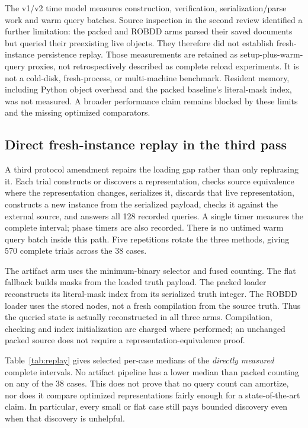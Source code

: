 \documentclass[11pt]{article}
\theoremstyle{definition}\newtheorem{definition}[theorem]{Definition}
\theoremstyle{remark}\newtheorem{remark}[theorem]{Remark}
\begin{document}
The v1/v2 time model measures construction, verification, serialization/parse work and warm query batches. Source inspection in the second review identified a further limitation: the packed and ROBDD arms parsed their saved documents but queried their preexisting live objects. They therefore did not establish fresh-instance persistence replay. Those measurements are retained as setup-plus-warm-query proxies, not retrospectively described as complete reload experiments. It is not a cold-disk, fresh-process, or multi-machine benchmark. Resident memory, including Python object overhead and the packed baseline's literal-mask index, was not measured. A broader performance claim remains blocked by these limits and the missing optimized comparators.


\subsection{Direct fresh-instance replay in the third pass}
A third protocol amendment repairs the loading gap rather than only rephrasing it. Each trial constructs or discovers a representation, checks source equivalence where the representation changes, serializes it, discards that live representation, constructs a new instance from the serialized payload, checks it against the external source, and answers all 128 recorded queries. A single timer measures the complete interval; phase timers are also recorded. There is no untimed warm query batch inside this path. Five repetitions rotate the three methods, giving 570 complete trials across the 38 cases.

The artifact arm uses the minimum-binary selector and fused counting. The flat fallback builds masks from the loaded truth payload. The packed loader reconstructs its literal-mask index from its serialized truth integer. The ROBDD loader uses the stored nodes, not a fresh compilation from the source truth. Thus the queried state is actually reconstructed in all three arms. Compilation, checking and index initialization are charged where performed; an unchanged packed source does not require a representation-equivalence proof.

Table~\ref{tab:replay} gives selected per-case medians of the \emph{directly measured} complete intervals. No artifact pipeline has a lower median than packed counting on any of the 38 cases. This does not prove that no query count can amortize, nor does it compare optimized representations fairly enough for a state-of-the-art claim. In particular, every small or flat case still pays bounded discovery even when that discovery is unhelpful.
\end{document}
